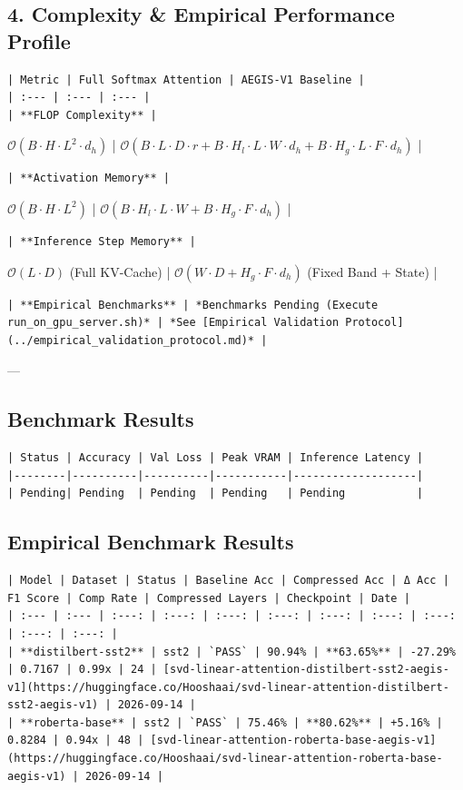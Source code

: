 \subsection{4. Complexity \& Empirical Performance Profile}
\begin{verbatim}
| Metric | Full Softmax Attention | AEGIS-V1 Baseline |
| :--- | :--- | :--- |
| **FLOP Complexity** | 
\end{verbatim}$\mathcal{O}(B \cdot H \cdot L^2 \cdot d_h)$ | $\mathcal{O}(B \cdot L \cdot D \cdot r + B \cdot H_l \cdot L \cdot W \cdot d_h + B \cdot H_g \cdot L \cdot F \cdot d_h)$ |
\begin{verbatim}
| **Activation Memory** | 
\end{verbatim}$\mathcal{O}(B \cdot H \cdot L^2)$ | $\mathcal{O}(B \cdot H_l \cdot L \cdot W + B \cdot H_g \cdot F \cdot d_h)$ |
\begin{verbatim}
| **Inference Step Memory** | 
\end{verbatim}$\mathcal{O}(L \cdot D)$ (Full KV-Cache) | $\mathcal{O}(W \cdot D + H_g \cdot F \cdot d_h)$ (Fixed Band + State) |
\begin{verbatim}
| **Empirical Benchmarks** | *Benchmarks Pending (Execute run_on_gpu_server.sh)* | *See [Empirical Validation Protocol](../empirical_validation_protocol.md)* |
\end{verbatim}

---

\subsection{Benchmark Results}
\begin{verbatim}
| Status | Accuracy | Val Loss | Peak VRAM | Inference Latency |
|--------|----------|----------|-----------|-------------------|
| Pending| Pending  | Pending  | Pending   | Pending           |
\end{verbatim}

\subsection{Empirical Benchmark Results}
\begin{verbatim}
| Model | Dataset | Status | Baseline Acc | Compressed Acc | Δ Acc | F1 Score | Comp Rate | Compressed Layers | Checkpoint | Date |
| :--- | :--- | :---: | :---: | :---: | :---: | :---: | :---: | :---: | :---: | :---: |
| **distilbert-sst2** | sst2 | `PASS` | 90.94% | **63.65%** | -27.29% | 0.7167 | 0.99x | 24 | [svd-linear-attention-distilbert-sst2-aegis-v1](https://huggingface.co/Hooshaai/svd-linear-attention-distilbert-sst2-aegis-v1) | 2026-09-14 |
| **roberta-base** | sst2 | `PASS` | 75.46% | **80.62%** | +5.16% | 0.8284 | 0.94x | 48 | [svd-linear-attention-roberta-base-aegis-v1](https://huggingface.co/Hooshaai/svd-linear-attention-roberta-base-aegis-v1) | 2026-09-14 |
\end{verbatim}
